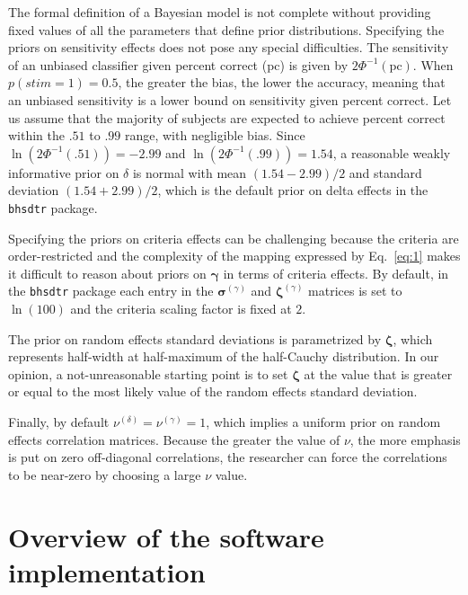 \documentclass[a4paper,man,apacite,floatsintext]{apa6}
\newcommand{\code}[1]{\texttt{#1}}
\begin{document}
The formal definition of a Bayesian model is not complete without
providing fixed values of all the parameters that define prior
distributions. Specifying the priors on sensitivity effects does not
pose any special difficulties. The sensitivity of an unbiased
classifier given percent correct (pc) is given by
$2 \Phi^{-1}(\text{pc})$. When $p(stim = 1) = 0.5$, the greater the
bias, the lower the accuracy, meaning that an unbiased sensitivity is
a lower bound on sensitivity given percent correct. Let us assume that
the majority of subjects are expected to achieve percent correct
within the $.51$ to $.99$ range, with negligible bias. Since
$\ln(2\Phi^{-1}(.51)) = -2.99$ and $\ln(2 \Phi^{-1}(.99)) = 1.54$, a
reasonable weakly informative prior on $\delta$ is normal with mean
$(1.54 - 2.99) / 2$ and standard deviation $(1.54 + 2.99) / 2$, which
is the default prior on delta effects in the \code{bhsdtr} package.

Specifying the priors on criteria effects can be challenging because
the criteria are order-restricted and the complexity of the mapping
expressed by Eq.~\ref{eq:1} makes it difficult to reason about priors
on $\bm{\gamma}$ in terms of criteria effects. By default, in the
\code{bhsdtr} package each entry in the $\bm{\sigma}^{(\gamma)}$ and
$\bm{\zeta}^{(\gamma)}$ matrices is set to $\ln(100)$ and the criteria
scaling factor is fixed at $2$.

The prior on random effects standard deviations is parametrized by
$\bm{\zeta}$, which represents half-width at half-maximum of the
half-Cauchy distribution. In our opinion, a not-unreasonable starting
point is to set $\bm{\zeta}$ at the value that is greater or equal to
the most likely value of the random effects standard deviation.

Finally, by default $\nu^{(\delta)} = \nu^{(\gamma)} = 1$, which
implies a uniform prior on random effects correlation
matrices. Because the greater the value of $\nu$, the more emphasis is
put on zero off-diagonal correlations, the researcher can force the
correlations to be near-zero by choosing a large $\nu$ value.

\section{Overview of the software implementation}
\end{document}
